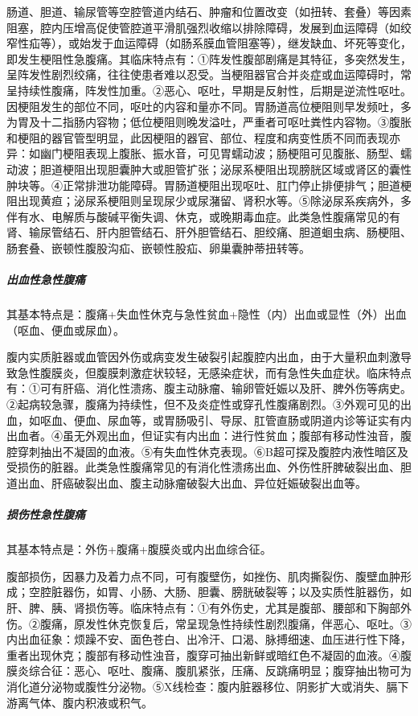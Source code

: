 肠道、胆道、输尿管等空腔管道内结石、肿瘤和位置改变（如扭转、套叠）等因素阻塞，腔内压增高促使管腔道平滑肌强烈收缩以排除障碍，发展到血运障碍（如绞窄性疝等），或始发于血运障碍（如肠系膜血管阻塞等），继发缺血、坏死等变化，即发生梗阻性急腹痛。其临床特点有：①阵发性腹部剧痛是其特征，多突然发生，呈阵发性剧烈绞痛，往往使患者难以忍受。当梗阻器官合并炎症或血运障碍时，常呈持续性腹痛，阵发性加重。②恶心、呕吐，早期是反射性，后期是逆流性呕吐。因梗阻发生的部位不同，呕吐的内容和量亦不同。胃肠道高位梗阻则早发频吐，多为胃及十二指肠内容物；低位梗阻则晚发溢吐，严重者可呕吐粪性内容物。③腹胀和梗阻的器官管型明显，此因梗阻的器官、部位、程度和病变性质不同而表现亦异：如幽门梗阻表现上腹胀、振水音，可见胃蠕动波；肠梗阻可见腹胀、肠型、蠕动波；胆道梗阻出现胆囊肿大或胆管扩张；泌尿系梗阻出现膀胱区域或肾区的囊性肿块等。④正常排泄功能障碍。胃肠道梗阻出现呕吐、肛门停止排便排气；胆道梗阻出现黄疸；泌尿系梗阻则呈现尿少或尿潴留、肾积水等。⑤除泌尿系疾病外，多伴有水、电解质与酸碱平衡失调、休克，或晚期毒血症。此类急性腹痛常见的有肾、输尿管结石、肝内胆管结石、肝外胆管结石、胆绞痛、胆道蛔虫病、肠梗阻、肠套叠、嵌顿性腹股沟疝、嵌顿性股疝、卵巢囊肿蒂扭转等。

\subparagraph{出血性急性腹痛}

其基本特点是：腹痛+失血性休克与急性贫血+隐性（内）出血或显性（外）出血（呕血、便血或尿血）。

腹内实质脏器或血管因外伤或病变发生破裂引起腹腔内出血，由于大量积血刺激导致急性腹膜炎，但腹膜刺激症状较轻，无感染症状，而有急性失血症状。临床特点有：①可有肝癌、消化性溃疡、腹主动脉瘤、输卵管妊娠以及肝、脾外伤等病史。②起病较急骤，腹痛为持续性，但不及炎症性或穿孔性腹痛剧烈。③外观可见的出血，如呕血、便血、尿血等，或胃肠吸引、导尿、肛管直肠或阴道内诊等证实有内出血者。④虽无外观出血，但证实有内出血：进行性贫血；腹部有移动性浊音，腹腔穿刺抽出不凝固的血液。⑤有失血性休克表现。⑥B超可探及腹腔内液性暗区及受损伤的脏器。此类急性腹痛常见的有消化性溃疡出血、外伤性肝脾破裂出血、胆道出血、肝癌破裂出血、腹主动脉瘤破裂大出血、异位妊娠破裂出血等。

\subparagraph{损伤性急性腹痛}

其基本特点是：外伤+腹痛+腹膜炎或内出血综合征。

腹部损伤，因暴力及着力点不同，可有腹壁伤，如挫伤、肌肉撕裂伤、腹壁血肿形成；空腔脏器伤，如胃、小肠、大肠、胆囊、膀胱破裂等；以及实质性脏器伤，如肝、脾、胰、肾损伤等。临床特点有：①有外伤史，尤其是腹部、腰部和下胸部外伤。②腹痛，原发性休克恢复后，常呈现急性持续性剧烈腹痛，伴恶心、呕吐。③内出血征象：烦躁不安、面色苍白、出冷汗、口渴、脉搏细速、血压进行性下降，重者出现休克；腹部有移动性浊音，腹穿可抽出新鲜或暗红色不凝固的血液。④腹膜炎综合征：恶心、呕吐、腹痛、腹肌紧张，压痛、反跳痛明显；腹穿抽出物可为消化道分泌物或腹性分泌物。⑤X线检查：腹内脏器移位、阴影扩大或消失、膈下游离气体、腹内积液或积气。

